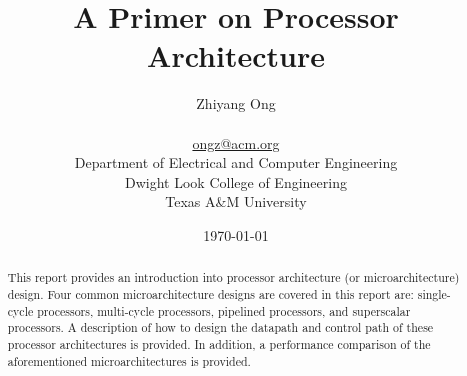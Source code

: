 \documentclass[letterpaper,12pt]{article}
\begin{document}










%
%
\title{\Huge \bf A Primer on Processor Architecture}

\date{\today}

\author{{\LARGE Zhiyang Ong} \\
\ \\
\href{mailto:ongz@acm.org}{ongz@acm.org} \\
Department of Electrical and Computer Engineering \\
Dwight Look College of Engineering \\
Texas A\&M University
}

\maketitle


%

\begin{abstract} 
This report provides an introduction into processor architecture (or microarchitecture) design. Four common microarchitecture designs are covered in this report are: single-cycle processors, multi-cycle processors, pipelined processors, and superscalar processors. A description of how to design the datapath and control path of these processor architectures is provided. In addition, a performance comparison of the aforementioned microarchitectures is provided.
\end{abstract}

\end{document}
